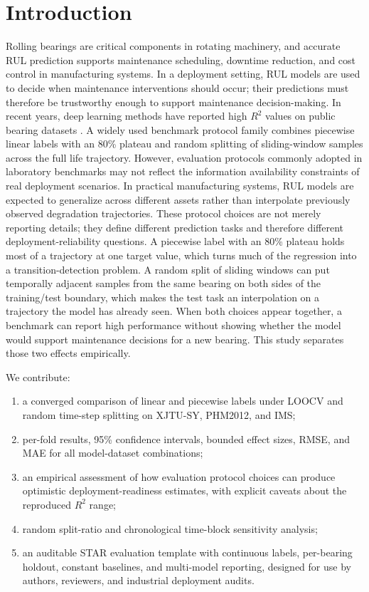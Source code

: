 \documentclass[pdflatex,sn-mathphys-num]{sn-jnl}
\begin{document}
\section{Introduction}
Rolling bearings are critical components in rotating machinery, and accurate RUL prediction supports maintenance scheduling, downtime reduction, and cost control in manufacturing systems. \cite{lei2018machinery,zhao2019deep} In a deployment setting, RUL models are used to decide when maintenance interventions should occur; their predictions must therefore be trustworthy enough to support maintenance decision-making. In recent years, deep learning methods have reported high $R^2$ values on public bearing datasets \cite{rul_lstm_uq_2022,reg_lstm_2021,gru_tim_2021,transformer_tim_2023}. A widely used benchmark protocol family combines piecewise linear labels with an 80\% plateau and random splitting of sliding-window samples across the full life trajectory. However, evaluation protocols commonly adopted in laboratory benchmarks may not reflect the information availability constraints of real deployment scenarios.
In practical manufacturing systems, RUL models are expected to generalize across different assets rather than interpolate previously observed degradation trajectories. These protocol choices are not merely reporting details; they define different prediction tasks and therefore different deployment-reliability questions. A piecewise label with an 80\% plateau holds most of a trajectory at one target value, which turns much of the regression into a transition-detection problem. A random split of sliding windows can put temporally adjacent samples from the same bearing on both sides of the training/test boundary, which makes the test task an interpolation on a trajectory the model has already seen. When both choices appear together, a benchmark can report high performance without showing whether the model would support maintenance decisions for a new bearing. This study separates those two effects empirically.


We contribute:
\begin{enumerate}
    \item a converged comparison of linear and piecewise labels under LOOCV and random time-step splitting on XJTU-SY, PHM2012, and IMS;
    \item per-fold results, 95\% confidence intervals, bounded effect sizes, RMSE, and MAE for all model-dataset combinations;
    \item an empirical assessment of how evaluation protocol choices can produce optimistic deployment-readiness estimates, with explicit caveats about the reproduced $R^2$ range;
    \item random split-ratio and chronological time-block sensitivity analysis;
    \item an auditable STAR evaluation template with continuous labels, per-bearing holdout, constant baselines, and multi-model reporting, designed for use by authors, reviewers, and industrial deployment audits.
\end{enumerate}
\end{document}
